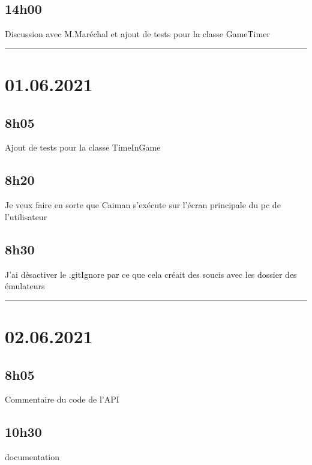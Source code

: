 \documentclass[a4paper,12pt,french]{sphinxmanual}
\begin{document}
\subsection{14h00}
\label{\detokenize{logbook:id177}}
\sphinxAtStartPar
Discussion avec M.Maréchal et ajout de tests pour la classe GameTimer


\bigskip\hrule\bigskip



\section{01.06.2021}
\label{\detokenize{logbook:id178}}

\subsection{8h05}
\label{\detokenize{logbook:id179}}
\sphinxAtStartPar
Ajout de tests pour la classe TimeInGame


\subsection{8h20}
\label{\detokenize{logbook:id180}}
\sphinxAtStartPar
Je veux faire en sorte que Caiman s’exécute sur l’écran principale du pc de l’utilisateur


\subsection{8h30}
\label{\detokenize{logbook:id181}}
\sphinxAtStartPar
J’ai désactiver le .gitIgnore par ce que cela créait des soucis avec les dossier des émulateurs


\bigskip\hrule\bigskip



\section{02.06.2021}
\label{\detokenize{logbook:id182}}

\subsection{8h05}
\label{\detokenize{logbook:id183}}
\sphinxAtStartPar
Commentaire du code de l’API


\subsection{10h30}
\label{\detokenize{logbook:id184}}
\sphinxAtStartPar
documentation
\end{document}
